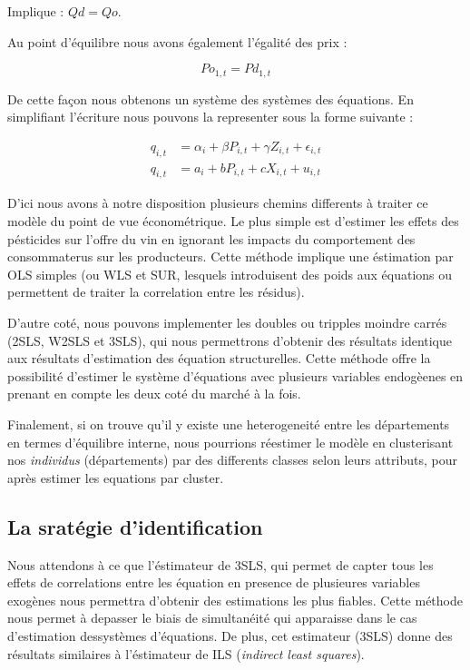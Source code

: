 \documentclass[11pt,]{article}
\begin{document}
Implique : \(Qd = Qo\).

Au point d'équilibre nous avons également l'égalité des prix :

\begin{equation*}
  Po_{1,t} = Pd_{1,t}
\end{equation*}

De cette façon nous obtenons un système des systèmes des équations. En
simplifiant l'écriture nous pouvons la representer sous la forme
suivante :

\begin{align*}
  q_{i,t} & = \alpha_{i} + \beta P_{i,t} + \gamma Z_{i,t} + \epsilon_{i,t} \\
  q_{i,t} & = a_i + b P_{i,t} + c X_{i,t} + u_{i,t}
\end{align*}

D'ici nous avons à notre disposition plusieurs chemins differents à
traiter ce modèle du point de vue économétrique. Le plus simple est
d'estimer les effets des pésticides sur l'offre du vin en ignorant les
impacts du comportement des consommaterus sur les producteurs. Cette
méthode implique une éstimation par OLS simples (ou WLS et SUR, lesquels
introduisent des poids aux équations ou permettent de traiter la
correlation entre les résidus).

D'autre coté, nous pouvons implementer les doubles ou tripples moindre
carrés (2SLS, W2SLS et 3SLS), qui nous permettrons d'obtenir des
résultats identique aux résultats d'estimation des équation
structurelles. Cette méthode offre la possibilité d'estimer le système
d'équations avec plusieurs variables endogèenes en prenant en compte les
deux coté du marché à la fois.

Finalement, si on trouve qu'il y existe une heterogeneité entre les
départements en termes d'équilibre interne, nous pourrions réestimer le
modèle en clusterisant nos \emph{individus} (départements) par des
differents classes selon leurs attributs, pour après estimer les
equations par cluster.

\hypertarget{la-srategie-didentification}{%
\subsection{La sratégie
d'identification}\label{la-srategie-didentification}}

Nous attendons à ce que l'éstimateur de 3SLS, qui permet de capter tous
les effets de correlations entre les équation en presence de plusieures
variables exogènes nous permettra d'obtenir des estimations les plus
fiables. Cette méthode nous permet à depasser le biais de simultanéité
qui apparaisse dans le cas d'estimation dessystèmes d'équations. De
plus, cet estimateur (3SLS) donne des résultats similaires à
l'éstimateur de ILS (\emph{indirect least squares}).
\end{document}
